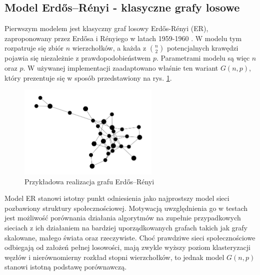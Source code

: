 \subsection{Model Erdős--Rényi - klasyczne grafy losowe}
Pierwszym modelem jest klasyczny graf losowy Erdős-Rényi (ER), zaproponowany przez Erdősa i Rényiego w latach 1959-1960 \cite{ErdosRenyi1960}. W modelu tym rozpatruje się zbiór $n$ wierzchołków, a każda z $\binom{n}{2}$ potencjalnych krawędzi pojawia się niezależnie z prawdopodobieństwem $p$. Parametrami modelu są więc $n$ oraz $p$. W używanej implementacji zaadaptowano właśnie ten wariant $G(n,p)$, który prezentuje się w sposób przedstawiony na rys. \ref{fig:ER}.

\begin{figure}[h]
    \centering
    \includegraphics[width=0.6\textwidth]{assets/test_data/random.png}
    \caption{Przykładowa realizacja grafu Erdős--Rényi}
    \label{fig:ER}
\end{figure}

Model ER stanowi istotny punkt odniesienia jako najprostszy model sieci pozbawiony struktury społecznościowej. Motywacją uwzględnienia go w testach jest możliwość porównania działania algorytmów na zupełnie przypadkowych sieciach z ich działaniem na bardziej uporządkowanych grafach takich jak grafy skalowane, małego świata oraz rzeczywiste. Choć prawdziwe sieci społecznościowe odbiegają od założeń pełnej losowości, mają zwykle wyższy poziom klasteryzacji węzłów i nierównomierny rozkład stopni wierzchołków, to jednak model $G(n, p)$ stanowi istotną podstawę porównawczą.

